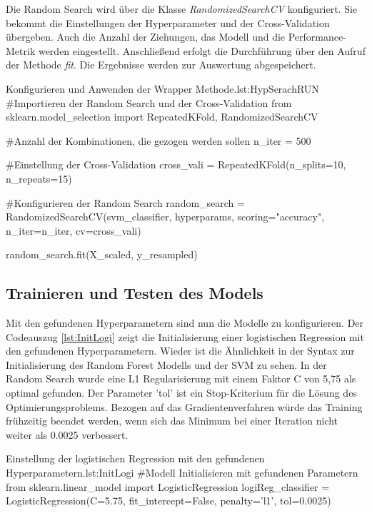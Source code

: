 Die Random Search wird über die Klasse \textit{RandomizedSearchCV} konfiguriert. Sie bekommt die Einstellungen der Hyperparameter und der Cross-Validation übergeben. Auch die Anzahl der Ziehungen, das Modell und die Performance-Metrik werden eingestellt. Anschließend erfolgt die Durchführung über den Aufruf der Methode \textit{fit}. Die Ergebnisse werden zur Auswertung abgespeichert.

\begin{pythoncode}{Konfigurieren und Anwenden der Wrapper Methode.}{lst:HypSerachRUN}
#Importieren der Random Search und der Cross-Validation
from sklearn.model_selection import RepeatedKFold, RandomizedSearchCV

#Anzahl der Kombinationen, die gezogen werden sollen
n_iter = 500

#Einstellung der Cross-Validation
cross_vali = RepeatedKFold(n_splits=10, n_repeats=15)

#Konfigurieren der Random Search 
random_search = RandomizedSearchCV(svm_classifier, 
                                   hyperparams, 
                                   scoring="accuracy", 
                                   n_iter=n_iter, 
                                   cv=cross_vali)

random_search.fit(X_scaled, y_resampled)
\end{pythoncode}



\subsection{Trainieren und Testen des Models} 
Mit den gefundenen Hyperparametern sind nun die Modelle zu konfigurieren. Der Codeauszug \ref{lst:InitLogi} zeigt die Initialisierung einer logistischen Regression mit den gefundenen Hyperparametern. Wieder ist die Ähnlichkeit in der Syntax zur Initialisierung des Random Forest Modells und der SVM zu sehen. In der Random Search wurde eine L1 Regularisierung mit einem Faktor C von 5,75 als optimal gefunden. Der Parameter 'tol' ist ein Stop-Kriterium für die Lösung des Optimierungsproblems. Bezogen auf das Gradientenverfahren würde das Training frühzeitig beendet werden, wenn sich das Minimum bei einer Iteration nicht weiter als 0.0025 verbessert. 

\begin{pythoncode}{Einstellung der logistischen Regression mit den gefundenen Hyperparametern.}{lst:InitLogi}
#Modell Initialisieren mit gefundenen Parametern
from sklearn.linear_model import LogisticRegression
logiReg_classifier = LogisticRegression(C=5.75,
                                        fit_intercept=False,
                                        penalty='l1',
                                        tol=0.0025)
\end{pythoncode}

